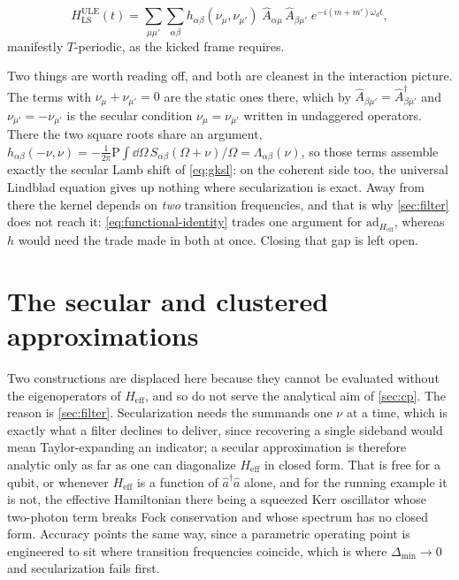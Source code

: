 \documentclass[a4paper,11pt]{article}
\newcommand{\eff}{\mathrm{eff}}
\newcommand{\ad}{\mathrm{ad}}
\begin{document}
\begin{equation}\label{eq:ule-lamb-kicked}
  H^{\mathrm{ULE}}_{\mathrm{LS}}(t) = \sum_{\mu\mu'}\sum_{\alpha\beta}
  h_{\alpha\beta}(\nu_\mu,\nu_{\mu'})\;\hat A_{\alpha\mu}\,\hat A_{\beta\mu'}\;
  e^{-i(m+m')\omega_d t} ,
\end{equation}
manifestly $T$-periodic, as the kicked frame requires.

Two things are worth reading off, and both are cleanest in the interaction picture. The terms with $\nu_\mu + \nu_{\mu'} = 0$ are the static ones there, which by $\hat A_{\beta\mu'} = \hat A^\dagger_{\beta\bar\mu'}$ and $\nu_{\bar\mu'} = -\nu_{\mu'}$ is the secular condition $\nu_\mu = \nu_{\bar\mu'}$ written in undaggered operators. There the two square roots share an argument, $h_{\alpha\beta}(-\nu,\nu) = -\tfrac{1}{2\pi}\mathrm{P}\!\int\dd\Omega\,S_{\alpha\beta}(\Omega+\nu)/\Omega = \Lambda_{\alpha\beta}(\nu)$, so those terms assemble exactly the secular Lamb shift of \eqref{eq:gksl}: on the coherent side too, the universal Lindblad equation gives up nothing where secularization is exact. Away from there the kernel depends on \emph{two} transition frequencies, and that is why \cref{sec:filter} does not reach it: \eqref{eq:functional-identity} trades one argument for $\ad_{H_\eff}$, whereas $h$ would need the trade made in both at once. Closing that gap is left open.


\section{The secular and clustered approximations}\label{app:secular}

Two constructions are displaced here because they cannot be evaluated without the eigenoperators of $H_\eff$, and so do not serve the analytical aim of \cref{sec:cp}. The reason is \cref{sec:filter}. Secularization needs the summands one $\nu$ at a time, which is exactly what a filter declines to deliver, since recovering a single sideband would mean Taylor-expanding an indicator; a secular approximation is therefore analytic only as far as one can diagonalize $H_\eff$ in closed form. That is free for a qubit, or whenever $H_\eff$ is a function of $\hat a^\dagger\hat a$ alone, and for the running example it is not, the effective Hamiltonian there being a squeezed Kerr oscillator whose two-photon term breaks Fock conservation and whose spectrum has no closed form. Accuracy points the same way, since a parametric operating point is engineered to sit where transition frequencies coincide, which is where $\Delta_{\min}\to0$ and secularization fails first.
\end{document}
